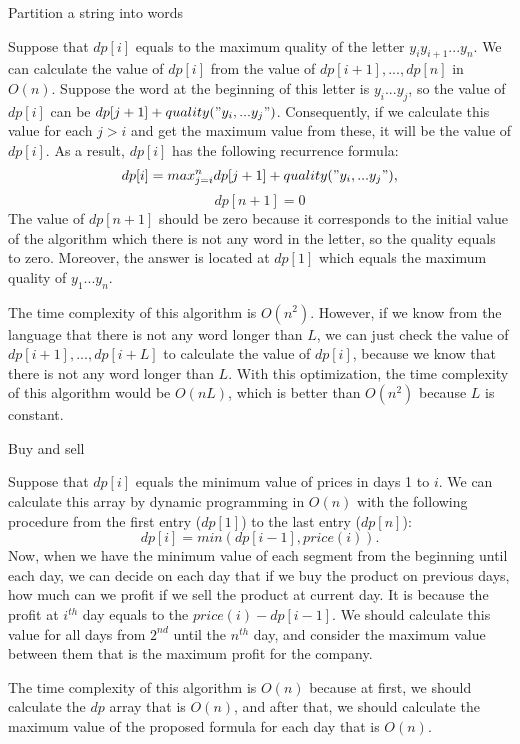 \documentclass[12pt]{article}
\newenvironment{solution}[2][Solution]{\begin{trivlist}
\item[\hskip \labelsep {\bfseries #1}]}{\end{trivlist}}
\newenvironment{problem}[2][Problem]{\begin{trivlist}
\item[\hskip \labelsep {\bfseries #1}\hskip \labelsep {\bfseries #2.}]}{\end{trivlist}}
\begin{document}
\begin{problem}{2}
Partition a string into words
\end{problem}

\begin{solution}{}
Suppose that $dp[i]$ equals to the maximum quality of the letter $y_iy_{i+1}...y_n$.
We can calculate the value of $dp[i]$ from the value of $dp[i+1], ..., dp[n]$ in $O(n)$.
Suppose the word at the beginning of this letter is $y_i...y_j$, so the value of $dp[i]$
can be $dp[j+1] + quality("y_i,...y_j")$. Consequently, if we calculate this value for 
each $j>i$ and get the maximum value from these, it will be the value of $dp[i]$.
As a result, $dp[i]$ has the following recurrence formula:
$$dp[i] = max_{j=i}^{n} dp[j+1] + quality("y_i,...y_j"),$$
$$dp[n+1] = 0$$
The value of $dp[n+1]$ should be zero because it corresponds to the initial value of the
algorithm which there is not any word in the letter, so the quality equals to zero.
Moreover, the answer is located at $dp[1]$ which equals the maximum quality of $y_1...y_n$.

The time complexity of this algorithm is $O(n^2)$. However, if we know from the language
that there is not any word longer than $L$, we can just check the value of $dp[i+1], ...,
dp[i+L]$ to calculate the value of $dp[i]$, because we know that there is not any word
longer than $L$. With this optimization, the time complexity of this algorithm would be
$O(nL)$, which is better than $O(n^2)$ because $L$ is constant.
\end{solution}


\begin{problem}{3}
Buy and sell
\end{problem}

\begin{solution}{}
Suppose that $dp[i]$ equals the minimum value of prices in days 1 to $i$. We can
calculate this array by dynamic programming in $O(n)$ with the following procedure
from the first entry ($dp[1]$) to the last entry ($dp[n]$):
$$dp[i] = min(dp[i-1], price(i)).$$
Now, when we have the minimum value of each segment from the beginning until each day,
we can decide on each day that if we buy the product on previous days, how much can
we profit if we sell the product at current day. It is because the profit at $i^{th}$ day
equals to the $price(i) - dp[i-1]$. We should calculate this value for all days from $2^{nd}$
until the $n^{th}$ day, and consider the maximum value between them that is the maximum
profit for the company.

The time complexity of this algorithm is $O(n)$ because at first, we should calculate the
$dp$ array that is $O(n)$, and after that, we should calculate the maximum value of the 
proposed formula for each day that is $O(n)$.
\end{solution}


\pagebreak
\end{document}
